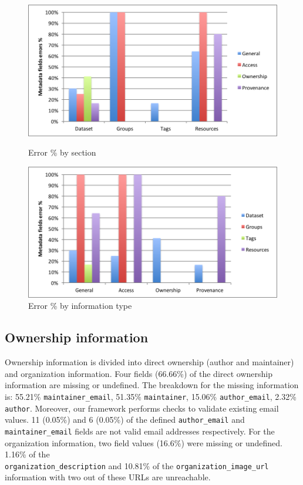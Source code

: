 \documentclass[runningheads,a4paper]{llncs}
\begin{document}
\begin{figure}
\parbox{7cm}{\hspace*{-.2in}
\includegraphics[width=.95\linewidth]{metadata_noise_by_section.png}
\captionsetup{textfont=small,singlelinecheck=off,justification=centering}
\caption{Error \% by section}
\label{fig:metadata_noise_by_section}}
\qquad
\begin{minipage}{7cm}\hspace*{-.6in}
\includegraphics[width=.95\linewidth]{metadata_noise_by_metadata_type.png}
\captionsetup{textfont=small,singlelinecheck=off,justification=raggedright}
\caption{Error \% by information type}
\label{fig:metadata_noise_by_metadata_type}
\end{minipage}
\end{figure}

\subsection{Ownership information}
Ownership information is divided into direct ownership (author and maintainer) and organization information. Four fields (66.66\%) of the direct ownership information are missing or undefined. The breakdown for the missing information is: 55.21\% \texttt{maintainer\_email}, 51.35\% \texttt{maintainer}, 15.06\% \texttt{author\_email}, 2.32\% \texttt{author}. Moreover, our framework performs checks to validate existing email values. 11 (0.05\%) and 6 (0.05\%) of the defined \texttt{author\_email} and \texttt{maintainer\_email} fields are not valid email addresses respectively. For the organization information, two field values (16.6\%) were missing or undefined. 1.16\% of the \\\texttt{organization\_description} and 10.81\% of the \texttt{organization\-\_image\_url} information with two out of these URLs are unreachable.
\end{document}
